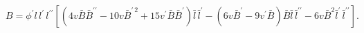 \begin{equation*}
B=\phi ^{\prime }l\,l^{\prime }\,l^{\prime \prime }[(4v\bar{B}\bar{B}%
^{\prime \prime }-10v\bar{B}^{\prime \,2}+15v^{\prime }\bar{B}\bar{B}%
^{\prime })\bar{l}\,\bar{l}^{\prime }-(6v\bar{B}^{\prime }-9v^{\prime }\bar{B%
})\bar{B}\bar{l}\,\bar{l}^{\prime \prime }-6v\bar{B}^{2}\bar{l}^{\prime }\,%
\bar{l}^{\prime \prime }].
\end{equation*}


